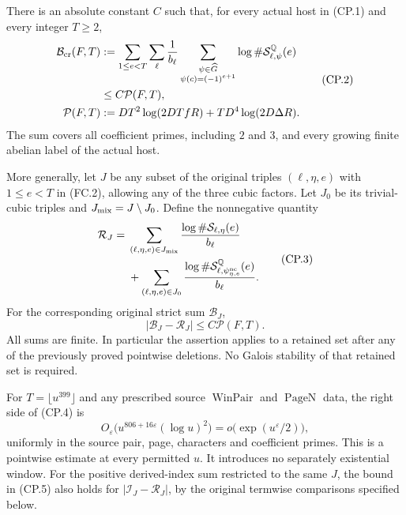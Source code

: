 \begin{theorem}
\label{AC-G191}
There is an absolute constant $C$ such that, for every actual host
in (CP.1) and every integer $T\geq2$,
\[
 \begin{split}
 \mathcal B_{\rm cr}(F,T)
 &:={\sum_{1\leq e<T}\sum_\ell\frac1{b_\ell}
       \sum_{\substack{\psi\in\widehat G\\\psi(c)=(-1)^{e+1}}}
                      \log\#\mathcal S^{\mathbb Q}_{\ell,\psi}(e)}\\
 &\leq C\mathcal P(F,T),\\
 \mathcal P(F,T)
 &:=DT^2\log(2DTfR)+TD^4\log(2D\Delta R).
 \end{split}                                                    \tag{CP.2}
\]
The sum covers all coefficient primes, including $2$ and $3$,
and every growing finite abelian label of the actual host.

More generally, let $J$ be any subset of the original triples
$(\ell,\eta,e)$ with $1\leq e<T$ in (FC.2), allowing any of the
three cubic factors.  Let $J_0$ be its trivial-cubic triples and
$J_{\rm mix}=J\setminus J_0$.  Define the nonnegative quantity
\[
 \begin{split}
 \mathcal R_J={}&
 \sum_{(\ell,\eta,e)\in J_{\rm mix}}
                  \frac{\log\#\mathcal S_{\ell,\eta}(e)}{b_\ell}\\
 &+\sum_{(\ell,\eta,e)\in J_0}
          \frac{\log\#\mathcal S^{\mathbb Q}_{\ell,
                                  \psi_{\eta,e}^{\rm nc}}(e)}{b_\ell}.
 \end{split}                                                    \tag{CP.3}
\]
For the corresponding original strict sum $\mathcal B_J$,
\[
       |\mathcal B_J-\mathcal R_J|\leq C\mathcal P(F,T).
                                                                  \tag{CP.4}
\]
All sums are finite.  In particular the assertion applies to a
retained set after any of the previously proved pointwise deletions.
No Galois stability of that retained set is required.

For $T=\lfloor u^{399}\rfloor$ and any prescribed source
$\operatorname{WinPair}$ and $\operatorname{PageN}$ data, the
right side of (CP.4) is
\[
       O_\varepsilon\bigl(u^{806+16\varepsilon}(\log u)^2\bigr)
              =o\bigl(\exp(u^\varepsilon/2)\bigr),                 \tag{CP.5}
\]
uniformly in the source pair, page, characters and coefficient
primes.  This is a pointwise estimate at every permitted $u$.
It introduces no separately existential window.
For the positive derived-index sum restricted to the same $J$,
the bound in (CP.5) also holds for $|\mathcal I_J-\mathcal R_J|$,
by the original termwise comparisons specified below.
\end{theorem}

